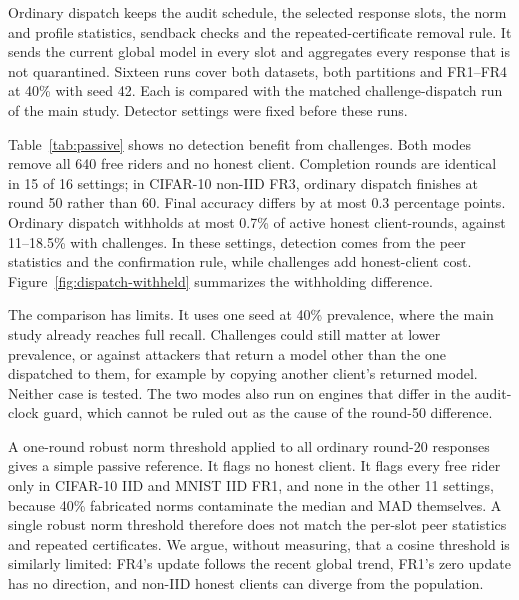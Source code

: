 \documentclass[journal]{IEEEtran}
\makeatletter
\renewcommand{\subsection}{\@startsection{subsection}{2}{\z@}{1.5ex}{0.7ex}{\normalfont\normalsize\itshape}}
\makeatother
\begin{document}
\subsection{Ordinary versus Challenge Dispatch}\label{sec:passive}
Ordinary dispatch keeps the audit schedule, the selected response slots,
the norm and profile statistics, sendback checks and the
repeated-certificate removal rule. It sends the current global model in
every slot and aggregates every response that is not quarantined.
Sixteen runs cover both datasets, both partitions and FR1--FR4 at 40\%
with seed 42. Each is compared with the matched challenge-dispatch run of
the main study. Detector settings were fixed before these runs.

Table~\ref{tab:passive} shows no detection benefit from challenges. Both
modes remove all 640 free riders and no honest client. Completion rounds
are identical in 15 of 16 settings; in CIFAR-10 non-IID FR3, ordinary
dispatch finishes at round 50 rather than 60. Final accuracy differs by
at most 0.3 percentage points. Ordinary dispatch withholds at most 0.7\%
of active honest client-rounds, against 11--18.5\% with challenges. In
these settings, detection comes from the peer statistics and the
confirmation rule, while challenges add honest-client cost.
Figure~\ref{fig:dispatch-withheld} summarizes the withholding difference.



The comparison has limits. It uses one seed at 40\% prevalence, where the
main study already reaches full recall. Challenges could still matter at
lower prevalence, or against attackers that return a model other than
the one dispatched to them, for example by copying another client's
returned model. Neither case is tested. The two modes also run on engines
that differ in the audit-clock guard, which cannot be ruled out as the
cause of the round-50 difference.

A one-round robust norm threshold applied to all ordinary round-20
responses gives a simple passive reference. It flags no honest client.
It flags every free rider only in CIFAR-10 IID and MNIST IID FR1, and none
in the other 11 settings, because 40\% fabricated norms contaminate the
median and MAD themselves. A single robust norm threshold therefore does
not match the per-slot peer statistics and repeated certificates. We
argue, without measuring, that a cosine threshold is similarly limited:
FR4's update follows the recent global trend, FR1's zero update has no
direction, and non-IID honest clients can diverge from the population.
\end{document}
